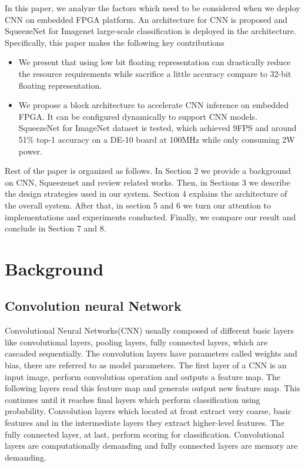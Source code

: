 \documentclass[conference]{IEEEtran}
\begin{document}
In this paper, we analyze the factors which need to be considered when we deploy CNN on embedded FPGA platform. An architecture for CNN is proposed and SqueezeNet for Imagenet large-scale classification is deployed in the architecture. Specifically, this paper makes the following key contributions

\begin{itemize}
\item
We present that using low bit floating representation can drastically reduce the resource requirements while sacrifice a little accuracy compare to 32-bit floating representation.
\item 
We propose a block architecture to accelerate CNN inference on embedded FPGA. It can be configured dynamically to support CNN models. SqueezeNet for ImageNet dataset is tested, which achieved 9FPS and around 51\% top-1 accuracy on a DE-10 board at 100MHz while only consuming 2W power.
\end{itemize}
Rest of the paper is organized as follows. In Section 2 we provide a background on CNN, Squeezenet and review related works. Then, in Sections 3 we describe the design strategies used in our system. Section 4 explains the architecture of the overall system. After that, in section 5 and 6 we turn our attention to implementations and experiments conducted.  Finally, we compare our result and conclude in Section 7 and 8.

\section{Background}
\subsection{Convolution neural Network}
Convolutional Neural Networks(CNN) usually composed of different basic layers like convolutional layers, pooling layers, fully connected layers, which are cascaded sequentially. The convolution layers have parameters called weights and bias, there are referred to as model parameters. The first layer of a CNN is an input image, perform convolution operation and outputs a feature map. The following layers read this feature map and generate output new feature map. This continues until it reaches final layers which perform classification using probability. Convolution layers which located at front extract very coarse, basic features and in the intermediate layers they extract higher-level features. The fully connected layer, at last, perform scoring for classification. Convolutional layers are computationally demanding and fully connected layers are memory are demanding. 
\end{document}
